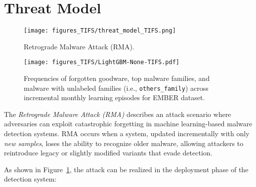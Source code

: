 \section{Threat Model}
\label{sec:threat_model}


\begin{figure}[!t]
    \centering
    \texttt{[image: figures\_TIFS/threat\_model\_TIFS.png]}
    \vspace{-0.2cm}
    \caption{Retrograde Malware Attack (RMA).}
    \label{fig:CFthreatModel}
    \vspace{-0.4cm}
\end{figure}


\begin{figure}[!t]
    \centering
    \texttt{[image: figures\_TIFS/LightGBM-None-TIFS.pdf]}
    \vspace{-0.2cm}
    \caption{Frequencies of forgotten goodware, top malware families, and malware with unlabeled families (i.e., \texttt{others\_family}) across incremental monthly learning episodes for EMBER dataset.}
    \label{fig:forgotten_frequencies}
    \vspace{-0.4cm}
\end{figure}


The \textit{Retrograde Malware Attack (RMA)} describes an attack scenario where adversaries can exploit catastrophic forgetting in machine learning-based malware detection systems. RMA occurs when a system, updated incrementally with only {\em new samples}, loses the ability to recognize older malware, allowing attackers to reintroduce legacy or slightly modified variants that evade detection.

As shown in Figure~\ref{fig:CFthreatModel}, the attack can be realized in the deployment phase of the detection system:

